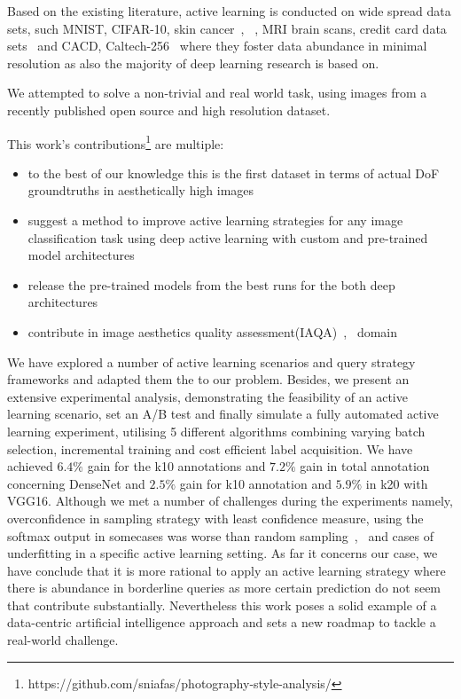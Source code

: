 Based on the existing literature, active learning is conducted on wide spread data sets, such MNIST, CIFAR-10, skin cancer~\cite{gissin2019discriminative}, ~\cite{gal2017deep}, MRI brain scans, credit card data sets~\cite{konyushkova2017learning} and CACD, Caltech-256~\cite{wang2016cost} where they foster data abundance in minimal resolution as also the majority of deep learning research is based on. 

We attempted to solve a non-trivial and real world task, using images from a recently published open source and high resolution dataset.

This work's contributions\footnote{https://github.com/sniafas/photography-style-analysis/} are multiple:
\begin{itemize}
 \item to the best of our knowledge this is the first dataset in terms of actual DoF groundtruths in aesthetically high images
 \item suggest a method to improve active learning strategies for any image classification task using deep active learning with custom and pre-trained model architectures
 \item release the pre-trained models from the best runs for the both deep architectures
 \item contribute in image aesthetics quality assessment(IAQA)~\cite{yang2019comprehensive},~\cite{zhang2021comprehensive} domain
\end{itemize}

We have explored a number of active learning scenarios and query strategy frameworks and adapted them the to our problem. Besides, we present an extensive experimental analysis, demonstrating the feasibility of an active learning scenario, set an A/B test and finally simulate a fully automated active learning experiment, utilising 5 different algorithms combining varying batch selection, incremental training and cost efficient label acquisition. We have achieved $6.4\%$ gain for the k10 annotations and $7.2\%$ gain in total annotation concerning DenseNet and $2.5\%$ gain for k10 annotation and $5.9\%$ in k20 with VGG16.
Although we met a number of challenges during the experiments namely, overconfidence in sampling strategy with least confidence measure, using the softmax output in somecases was worse than random sampling~\cite{zhdanov2019diverse},~\cite{ren2020survey} and cases of underfitting in a specific active learning setting.
As far it concerns our case, we have conclude that it is more rational to apply an active learning strategy where there is abundance in borderline queries as more certain prediction do not seem that contribute substantially.
Nevertheless this work poses a solid example of a data-centric artificial intelligence approach and sets a new roadmap to tackle a real-world challenge.

